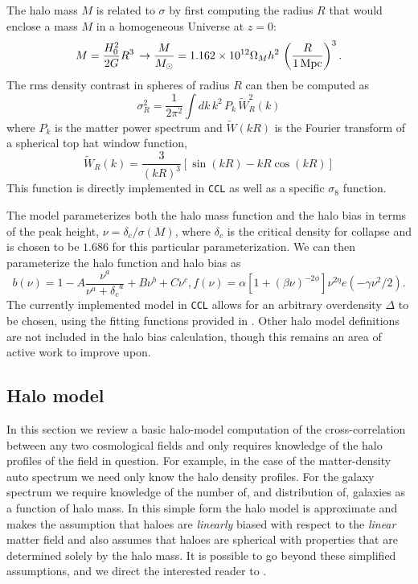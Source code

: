 \documentclass[\docopts]{\docclass}
\newcommand{\ccl}{{\tt CCL}\xspace}
\begin{document}
The halo mass $M$ is related to $\sigma$ by first computing the radius $R$ that
would enclose a mass $M$ in a homogeneous Universe at $z=0$:
\begin{equation}
  M=\frac{H_0^2}{2G}R^3\,\rightarrow \frac{M}{M_\odot}=1.162\times10^{12}\Omega_Mh^2\,\left(\frac{R}{1\,{\rm Mpc}}\right)^3.
\end{equation}
The rms density contrast in spheres of radius $R$ can then be computed as
\begin{equation}
  \sigma_R^2 = \frac{1}{2\pi^2}\int dk\,k^2\,P_k\,\tilde{W}_R^2(k)
  \label{eq:sigR}
\end{equation}
where $P_k$ is the matter power spectrum and $\tilde{W}(kR)$ is the Fourier
transform of a spherical top hat window function,
\begin{equation}
\tilde{W}_R(k) = \frac{3}{(kR)^3}[\sin(kR)-kR\cos(kR)]
\end{equation}
%
This function is directly implemented in \ccl as well as a specific $\sigma_8$ function.

The \citet{Tinker2010} model parameterizes both the halo mass function and the
halo bias in terms of the peak height, $\nu = \delta_c / \sigma(M)$, where $\delta_c$
is the critical density for collapse and is chosen to be $1.686$ for this
particular parameterization. We can then parameterize the halo function and halo bias as
\begin{equation}
  b(\nu) = 1 - A\frac{\nu^a}{\nu^a + {\delta_c}^a} + B\nu^b+C\nu^c,
  f(\nu) = \alpha[1+(\beta\nu)^{-2\phi}]\nu^{2\eta}e(-\gamma\nu^2/2).
  \label{eq:halo_bias_and_mass_function}
\end{equation}
The currently implemented model in \ccl allows for an arbitrary overdensity
$\Delta$ to be chosen, using the fitting functions provided in \citet{Tinker2010}.
Other halo model definitions are not included in the halo bias calculation,
though this remains an area of active work to improve upon.

\subsection{Halo model}
\label{sec:halo_model}

In this section we review a basic halo-model computation
\citep{Seljak2000,Peacock2000,Cooray2002} of the cross-correlation between any
two cosmological fields and only requires knowledge of the halo profiles of the
field in question. For example, in the case of the matter-density auto spectrum
we need only know the halo density profiles. For the galaxy spectrum we require
knowledge of the number of, and distribution of, galaxies as a function of halo
mass. In this simple form the halo model is approximate and makes the assumption
that haloes are \emph{linearly} biased with respect to the \emph{linear} matter
field and also assumes that haloes are spherical with properties that are
determined solely by the halo mass. It is possible to go beyond these simplified
assumptions, and we direct the interested reader to
\cite{Cooray2002,Smith2007,Giocoli2010,Smith2011}.
\end{document}
